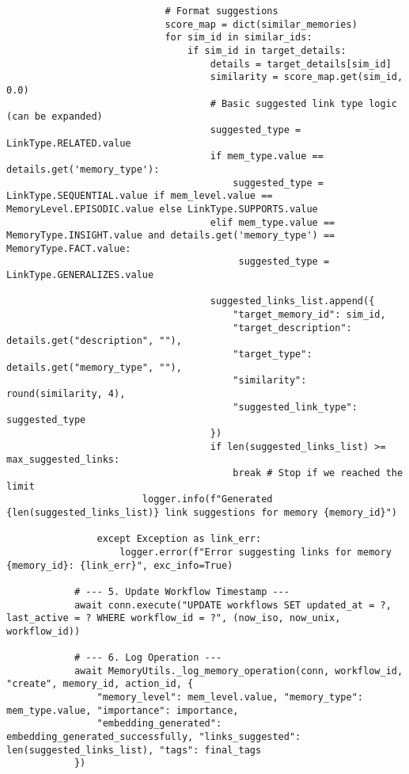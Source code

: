 \documentclass[12pt,a4paper]{article}
\begin{document}
\begin{pageablecode}
\begin{verbatim}
                            # Format suggestions
                            score_map = dict(similar_memories)
                            for sim_id in similar_ids:
                                if sim_id in target_details:
                                    details = target_details[sim_id]
                                    similarity = score_map.get(sim_id, 0.0)
                                    # Basic suggested link type logic (can be expanded)
                                    suggested_type = LinkType.RELATED.value
                                    if mem_type.value == details.get('memory_type'):
                                        suggested_type = LinkType.SEQUENTIAL.value if mem_level.value == MemoryLevel.EPISODIC.value else LinkType.SUPPORTS.value
                                    elif mem_type.value == MemoryType.INSIGHT.value and details.get('memory_type') == MemoryType.FACT.value:
                                         suggested_type = LinkType.GENERALIZES.value

                                    suggested_links_list.append({
                                        "target_memory_id": sim_id,
                                        "target_description": details.get("description", ""),
                                        "target_type": details.get("memory_type", ""),
                                        "similarity": round(similarity, 4),
                                        "suggested_link_type": suggested_type
                                    })
                                    if len(suggested_links_list) >= max_suggested_links:
                                        break # Stop if we reached the limit
                        logger.info(f"Generated {len(suggested_links_list)} link suggestions for memory {memory_id}")

                except Exception as link_err:
                    logger.error(f"Error suggesting links for memory {memory_id}: {link_err}", exc_info=True)

            # --- 5. Update Workflow Timestamp ---
            await conn.execute("UPDATE workflows SET updated_at = ?, last_active = ? WHERE workflow_id = ?", (now_iso, now_unix, workflow_id))

            # --- 6. Log Operation ---
            await MemoryUtils._log_memory_operation(conn, workflow_id, "create", memory_id, action_id, {
                "memory_level": mem_level.value, "memory_type": mem_type.value, "importance": importance,
                "embedding_generated": embedding_generated_successfully, "links_suggested": len(suggested_links_list), "tags": final_tags
            })


\end{verbatim}
\end{pageablecode}
\end{document}
